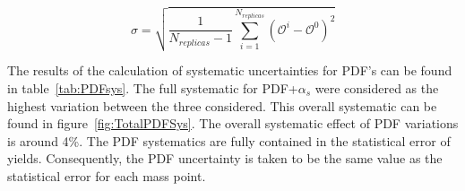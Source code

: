 \begin{equation} \label{eq:quadsumNNPDF}
\sigma = \sqrt{\frac{1}{N_{replicas}-1}\sum_{i=1}^{N_{replicas}}(\mathcal{O}^{i}-\mathcal{O}^{0})^{2}} 
\end{equation}

The results of the calculation of systematic uncertainties for PDF's can be found in table~\ref{tab:PDFsys}. The full systematic for PDF+$\alpha_{s}$ were considered as the highest variation between the three considered. This overall systematic can be found in figure~\ref{fig:TotalPDFSys}. The overall systematic effect of PDF variations is around 4\%. The PDF systematics are fully contained in the statistical error of yields. Consequently, the PDF uncertainty is taken to be the same value as the statistical error for each mass point.

\begin{table*}[htbH]
\begin{center}
\caption{PDF+$\alpha_{s}$ uncertainties for signal samples\label{tab:PDFsys}}
\end{center}
\end{table*}

